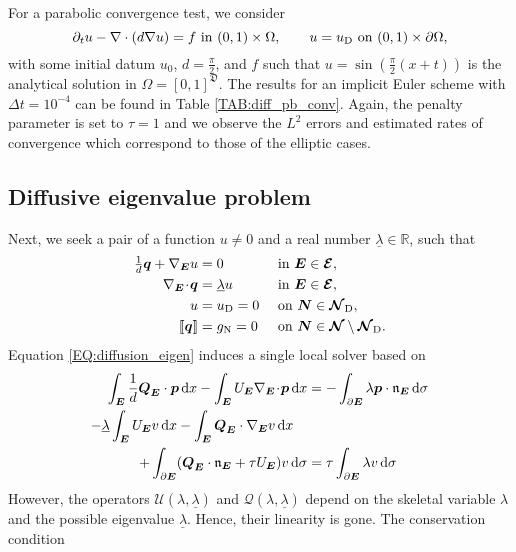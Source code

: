 \documentclass[a4paper, english, 12pt, reqno, draft]{amsart}
\theoremstyle{definition}
\theoremstyle{remark}
\numberwithin{equation}{section}
\newcommand{\SetEdge}{\ensuremath{\boldsymbol{\mathcal E}}}
\newcommand{\SetNode}{\ensuremath{\boldsymbol{\mathcal N}}}
\newcommand{\SetNodeDir}{\ensuremath{\SetNode_\textup D}}
\newcommand{\Edge}{{\ensuremath{\boldsymbol E}}}
\newcommand{\Node}{{\ensuremath{\boldsymbol N}}}
\newcommand{\globDim}{\ensuremath{\mathfrak D}}
\newcommand{\Nabla}{\ensuremath{\nabla_\Edge}}
\newcommand{\Div}{\ensuremath{\Nabla\!\cdot\!}}
\newcommand{\Normal}{\ensuremath{\mathfrak n_\Edge}}
\newcommand{\jump}[1]{{[\![ #1 ]\!]}}
\newcommand{\IR}{\ensuremath{\mathbb R}}
\renewcommand{\vec}[1]{\ensuremath{\boldsymbol{#1}}}
\newcommand{\dx}{\ensuremath{\, \textup d x}}
\newcommand{\ds}{\ensuremath{\, \textup d \sigma}}
\newcommand{\localU}{\ensuremath{\mathcal U}}
\newcommand{\localQ}{\ensuremath{\vec{\mathcal Q}}}
\newcommand{\eigenval}{\ensuremath{\underline \lambda}}
\begin{document}
% 
For a parabolic convergence test, we consider
% 
\begin{equation}
 \partial_t u - \nabla \cdot (d \nabla u) = f \text{ in } (0,1) \times \Omega, \qquad u = u_\text D \text{ on } (0,1) \times \partial \Omega,
\end{equation}
% 
with some initial datum $u_0$, $d = \tfrac{\pi}{2}$, and $f$ such that $u = \sin(\tfrac{\pi}{2}(x + t))$ is the analytical solution in $\Omega = [0,1]^\globDim$. The results for an implicit Euler scheme with $\Delta t = 10^{-4}$ can be found in Table \ref{TAB:diff_pb_conv}. Again, the penalty parameter is set to $\tau = 1$ and we observe the $L^2$ errors and estimated rates of convergence which correspond to those of the elliptic cases.
% 
\subsection{Diffusive eigenvalue problem}
% 
Next, we seek a pair of a function  $u \neq 0$ and a real number $\eigenval \in \IR$, such that
% 
\begin{subequations}\label{EQ:diffusion_eigen}
\begin{align}
 \tfrac{1}{d} \vec q + \Nabla u & = 0 && \text{ in } \Edge \in \SetEdge,\\
 \Div \vec q & = \eigenval u && \text{ in } \Edge \in \SetEdge,\\
  u & = u_\textup D = 0 && \text{ on } \Node \in \SetNodeDir,\\
 \jump{\vec q} & = g_\textup N = 0 && \text{ on } \Node \in \SetNode \setminus \SetNodeDir.
\end{align}
\end{subequations}
% 
Equation \eqref{EQ:diffusion_eigen} induces a single local solver based on
% 
\begin{subequations}\label{EQ:hdg_scheme_eigen}
 \begin{align}
  \int_\Edge \frac{1}{d} \vec Q_\Edge \cdot \vec p \dx - \int_\Edge U_\Edge \Div \vec p \dx & = - \int_{\partial \Edge} \lambda \vec p \cdot \Normal \ds\\
  - \eigenval \int_\Edge U_\Edge v \dx - \int_\Edge \vec Q_\Edge \cdot \Nabla v \dx \quad \notag\\
  + \int_{\partial \Edge} ( \vec Q_\Edge \cdot \Normal + \tau  U_\Edge ) v \ds
  & = \tau \int_{\partial \Edge} \lambda v \ds
 \end{align}
\end{subequations}
% 
However, the operators $\localU(\lambda, \eigenval)$ and $\localQ(\lambda, \eigenval)$ depend on the skeletal variable $\lambda$ and the possible eigenvalue $\eigenval$. Hence, their linearity is gone. The conservation condition 
\end{document}
